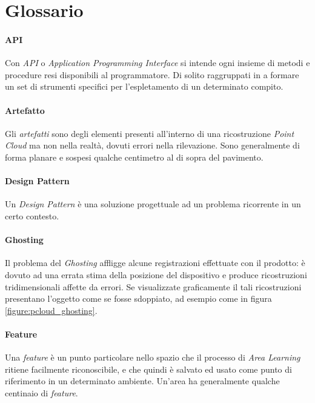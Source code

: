 
\chapter{Glossario}\label{appendix:Glossario}

\subsubsection{API}
Con \emph{API} o \emph{Application Programming Interface} si intende ogni insieme di metodi e procedure resi disponibili al programmatore. Di solito raggruppati in a formare un set di strumenti specifici per l'espletamento di un determinato compito.

\subsubsection{Artefatto}
Gli \emph{artefatti} sono degli elementi presenti all'interno di una ricostruzione \emph{Point Cloud} ma non nella realtà, dovuti errori nella rilevazione. Sono generalmente di forma planare e sospesi qualche centimetro al di sopra del pavimento.

\subsubsection{Design Pattern}
Un \emph{Design Pattern} è una soluzione progettuale ad un problema ricorrente in un certo contesto.

\subsubsection{Ghosting}
Il problema del \emph{Ghosting} affligge alcune registrazioni effettuate con il prodotto: è dovuto ad una errata stima della posizione del dispositivo e produce ricostruzioni tridimensionali affette da errori. Se visualizzate graficamente il tali ricostruzioni presentano l'oggetto come se fosse sdoppiato, ad esempio come in figura \ref{figure:pcloud_ghosting}.

\subsubsection{Feature}
Una \emph{feature} è un punto particolare nello spazio che il processo di \emph{Area Learning} ritiene facilmente riconoscibile, e che quindi è salvato ed usato come punto di riferimento in un determinato ambiente. Un'area ha generalmente qualche centinaio di \emph{feature}.

